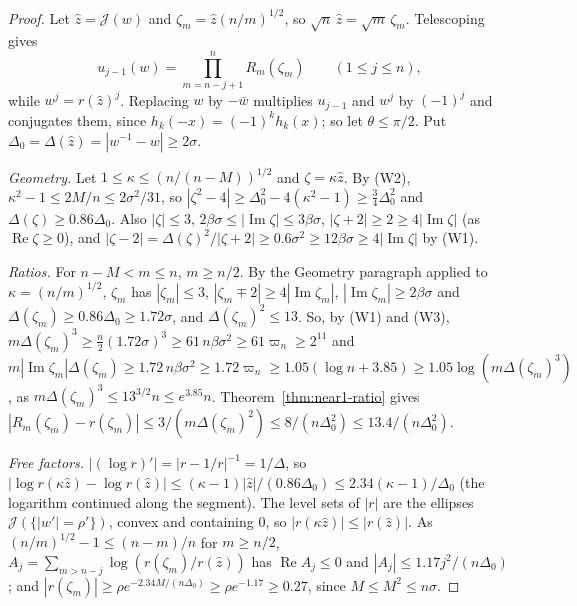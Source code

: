 \documentclass[11pt]{amsart}
\theoremstyle{definition}
\theoremstyle{remark}
\numberwithin{equation}{section}
\DeclareMathOperator{\re}{Re}
\DeclareMathOperator{\im}{Im}
\begin{document}
\begin{proof}
Let $\hat z=\mathcal J(w)$ and $\zeta_m=\hat z(n/m)^{1/2}$, so $\sqrt n\,\hat z=\sqrt m\,\zeta_m$. Telescoping gives
\begin{equation}\label{eq:near1-product}
u_{j-1}(w)=\prod_{m=n-j+1}^{n}R_m(\zeta_m)\qquad(1\le j\le n),
\end{equation}
while $w^j=r(\hat z)^j$. Replacing $w$ by $-\bar w$ multiplies $u_{j-1}$ and $w^j$ by $(-1)^j$ and conjugates them, since $h_k(-x)=(-1)^kh_k(x)$; so let $\theta\le\pi/2$. Put $\Delta_0=\Delta(\hat z)=|w^{-1}-w|\ge2\sigma$.

\emph{Geometry.} Let $1\le\kappa\le(n/(n-M))^{1/2}$ and $\zeta=\kappa\hat z$. By (W2), $\kappa^2-1\le2M/n\le2\sigma^2/31$, so $|\zeta^2-4|\ge\Delta_0^2-4(\kappa^2-1)\ge\frac34\Delta_0^2$ and $\Delta(\zeta)\ge0.86\Delta_0$. Also $|\zeta|\le3$, $2\beta\sigma\le|\im\zeta|\le3\beta\sigma$, $|\zeta+2|\ge2\ge4|\im\zeta|$ (as $\re\zeta\ge0$), and $|\zeta-2|=\Delta(\zeta)^2/|\zeta+2|\ge0.6\sigma^2\ge12\beta\sigma\ge4|\im\zeta|$ by (W1).

\emph{Ratios.} For $n-M<m\le n$, $m\ge n/2$. By the Geometry paragraph applied to $\kappa=(n/m)^{1/2}$, $\zeta_m$ has $|\zeta_m|\le3$, $|\zeta_m\mp2|\ge4|\im\zeta_m|$, $|\im\zeta_m|\ge2\beta\sigma$ and $\Delta(\zeta_m)\ge0.86\Delta_0\ge1.72\sigma$, and $\Delta(\zeta_m)^2\le13$. So, by (W1) and (W3), $m\Delta(\zeta_m)^3\ge\frac n2(1.72\sigma)^3\ge61\,n\beta\sigma^2\ge61\varpi_n\ge2^{11}$ and $m|\im\zeta_m|\Delta(\zeta_m)\ge1.72\,n\beta\sigma^2\ge1.72\varpi_n\ge1.05(\log n+3.85)\ge1.05\log(m\Delta(\zeta_m)^3)$, as $m\Delta(\zeta_m)^3\le13^{3/2}n\le e^{3.85}n$. Theorem~\ref{thm:near1-ratio} gives $|R_m(\zeta_m)-r(\zeta_m)|\le3/(m\Delta(\zeta_m)^2)\le8/(n\Delta_0^2)\le13.4/(n\Delta_0^2)$.

\emph{Free factors.} $|(\log r)'|=|r-1/r|^{-1}=1/\Delta$, so $|\log r(\kappa\hat z)-\log r(\hat z)|\le(\kappa-1)|\hat z|/(0.86\Delta_0)\le2.34(\kappa-1)/\Delta_0$ (the logarithm continued along the segment). The level sets of $|r|$ are the ellipses $\mathcal J(\{|w'|=\rho'\})$, convex and containing $0$, so $|r(\kappa\hat z)|\le|r(\hat z)|$. As $(n/m)^{1/2}-1\le(n-m)/n$ for $m\ge n/2$, $A_j=\sum_{m>n-j}\log(r(\zeta_m)/r(\hat z))$ has $\re A_j\le0$ and $|A_j|\le1.17j^2/(n\Delta_0)$; and $|r(\zeta_m)|\ge\rho e^{-2.34M/(n\Delta_0)}\ge\rho e^{-1.17}\ge0.27$, since $M\le M^2\le n\sigma$.


\end{proof}
\end{document}
